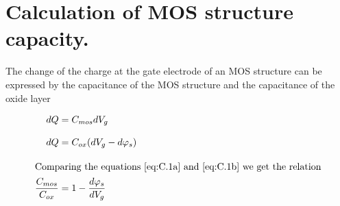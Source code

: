 
\chapter{Calculation of MOS structure capacity.}\label{app:AppendixC}

The change of the charge at the gate electrode of an MOS structure can
be expressed by the capacitance of the MOS structure and the
capacitance of the oxide layer

\begin{subequations}\label{eq:C.1}
  \begin{align}
    dQ &= C_{mos} dV_g                                    \label{eq:C.1a}\\[0.3cm]
    dQ &= C_{ox} (dV_g - d\varphi_s)                      \label{eq:C.1b}\\[0.3cm]
    \intertext{Comparing the equations~\ref{eq:C.1a} and~\ref{eq:C.1b} we get the relation}
    \frac{C_{mos}}{C_{ox}} &= 1 - \frac{d\varphi_s}{dV_g} \label{eq:C.1c}
  \end{align}
\end{subequations}
